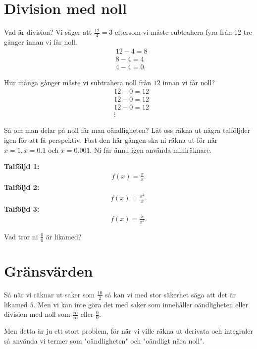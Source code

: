 \documentclass{beamer}
\begin{document}
\section*{Division med noll}
\label{sec:org6ddf76d}
\begin{frame}{Vad är division?}
Vi säger att \(\frac{12}{4} = 3\) eftersom vi måste subtrahera fyra från 12 tre gånger
innan vi får noll.
\begin{align*}
&  12 - 4 = 8 \\
&  8 - 4 = 4 \\
&  4 - 4 = 0
.
\end{align*}

Hur många gånger måste vi subtrahera noll från \(12\) innan vi får noll?
\begin{align*}
&  12 - 0 = 12 \\
&  12 - 0 = 12 \\
&  12 - 0 = 12 \\
 &  \vdots 
\end{align*}
\end{frame}

\begin{frame}{Så om man delar på noll får man oändligheten?}
Låt oss räkna ut några talföljder igen för att få perspektiv. Fast den här
gången ska ni räkna ut för när \(x=1, x=0.1\) och \(x= 0.001\). Ni får
ännu igen använda miniräknare.

\textbf{Talföljd 1:} \begin{align*}
f (x) = \frac{x}{x}
.
\end{align*}
\textbf{Talföljd 2:} \begin{align*}
f(x) = \frac{x^2}{x}
.
\end{align*}
\textbf{Talföljd 3:} \begin{align*}
f(x) = \frac{x}{x^2}
.
\end{align*}

Vad tror ni \(\frac{0}{0}\) är likamed?
\end{frame}


\section*{Gränsvärden}
\label{sec:orga107ff2}

\begin{frame}{}
Så när vi räknar ut saker som \(\frac{10}{2}\) så kan vi med stor
säkerhet säga att det är likamed \(5\). Men vi kan inte
göra det med saker som innehåller oändligheten eller
division med noll som \(\frac{\infty}{\infty }\) eller \(\frac{0}{0}\).


Men detta är ju ett stort problem, för när vi ville räkna ut
derivata och integraler så använda vi termer som "oändligheten"
och "oändligt nära noll".
\end{frame}
\end{document}
